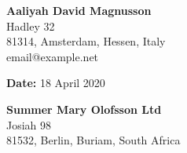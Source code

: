 \documentclass[a4paper]{letter}
\begin{document}
\RaggedRight
%
\begin{minipage}[t]{0.5\textwidth}
	\begin{flushleft}

	\end{flushleft}
\end{minipage}%
\begin{minipage}[t]{0.5\textwidth}
 	\begin{flushright}
		\textbf{\huge  Aaliyah David Magnusson} \\
		{\large Hadley 32}\\
		{\large 81314, Amsterdam, Hessen, Italy }\\
		{\large email@example.net}
	
 	\end{flushright}
\end{minipage}%

\begin{minipage}[t]{0.5\textwidth}
	\begin{flushleft}

	\end{flushleft}
\end{minipage}%
\begin{minipage}[t]{0.5\textwidth}
 	\begin{flushright}
		\textbf{\large Date:} 18 April 2020\\		
 	\end{flushright}
\end{minipage}%

\begin{minipage}[t]{0.5\textwidth}
	\begin{flushleft}
	 	\textbf{\large Summer Mary 	 Olofsson Ltd } \\
		{\large Josiah 98}\\
		{\large 81532, Berlin, Buriam, South Africa }\\
	\end{flushleft}
\end{minipage}
\begin{minipage}[t]{0.5\textwidth}
 	\begin{flushright} 	
	
 	\end{flushright}
\end{minipage}%
\end{document}
